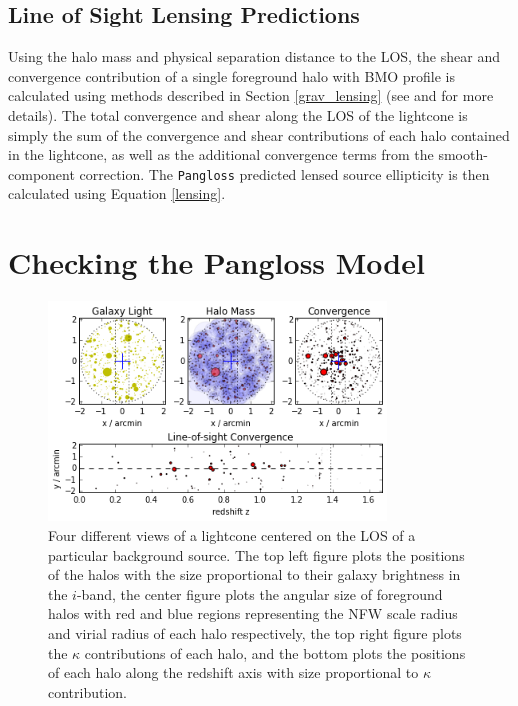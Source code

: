 \documentclass[%
 reprint,
 amsmath,amssymb,
 aps,nofootinbib
]{revtex4-1}
\begin{document}
\subsection{Line of Sight Lensing Predictions}

Using the halo mass and physical separation distance to the LOS, the shear and convergence contribution of a single foreground halo with BMO profile is calculated using methods described in Section \ref{grav_lensing} (see \cite{nfw_bmo} and \cite{lensing_calc} for more details). The total convergence and shear along the LOS of the lightcone is simply the sum of the convergence and shear contributions of each halo contained in the lightcone, as well as the additional convergence terms from the smooth-component correction. The \texttt{Pangloss} predicted lensed source ellipticity is then calculated using Equation \eqref{lensing}.


\section{Checking the Pangloss Model} \label{check}

\begin{figure}
    \centering
    \includegraphics[width=0.8\textwidth]{figs-swe/thesis/lightcone_plots.png}
    \captionsetup{justification=raggedright,singlelinecheck=false}
    \caption{Four different views of a lightcone centered on the LOS of a particular background source.  The top left figure plots the positions of the halos with the size proportional to their galaxy brightness in the $i$-band, the center figure plots the angular size of foreground halos with red and blue regions representing the NFW scale radius and virial radius of each halo respectively, the top right figure plots the $\kappa$ contributions of each halo, and the bottom plots the positions of each halo along the redshift axis with size proportional to $\kappa$ contribution.}
    \label{fig:lightcone}
\end{figure}
\end{document}
